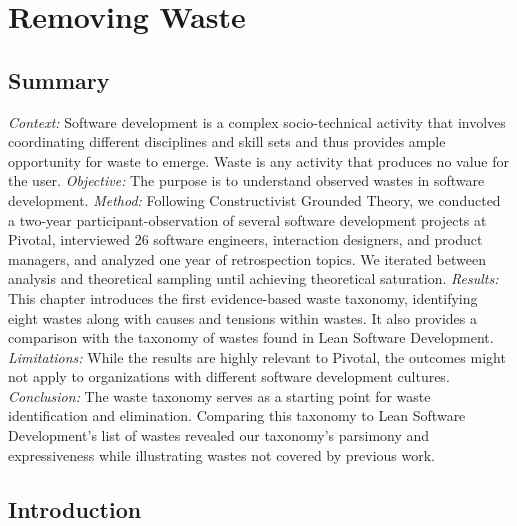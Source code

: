 \chapter{Removing Waste}
\section{Summary}

\textit{Context:} Software development is a complex socio-technical activity that involves coordinating different disciplines and skill sets and thus provides ample opportunity for waste to emerge. Waste is any activity that produces no value for the user.
\textit{Objective:} The purpose is to understand observed wastes in software development.
\textit{Method:} Following Constructivist Grounded Theory, we conducted a two-year participant-observation of several software development projects at Pivotal, interviewed 26 software engineers, interaction designers, and product managers, and analyzed one year of retrospection topics. We iterated between analysis and theoretical sampling until achieving theoretical saturation.
\textit{Results:}  This chapter introduces the first evidence-based waste taxonomy, identifying eight wastes along with causes and tensions within wastes. It also provides a comparison with the taxonomy of wastes found in Lean Software Development.
\textit{Limitations:} While the results are highly relevant to Pivotal, the outcomes might not apply to organizations with different software development cultures.
\textit{Conclusion:} The waste taxonomy serves as a starting point for waste identification and elimination. Comparing this taxonomy to Lean Software Development's list of wastes revealed our taxonomy's parsimony and expressiveness while illustrating wastes not covered by previous work. 

\section{Introduction}

